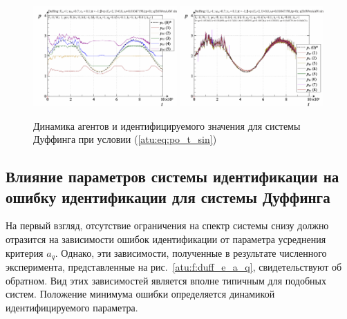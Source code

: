 \begin{figure}[ht!]
\begin{center}
  \includegraphics[width=0.49\textwidth]{p/cha/duff/duff_id-p_t_pi_ql3rlWvnAAW_sin.png}
  \hfill
  \includegraphics[width=0.49\textwidth]{p/cha/duff/duff_id-p_t_p_ql3rlWvnAAW_sin.png}
\end{center}
  \caption{Динамика агентов и идентифицируемого значения для системы Дуффинга при условии (\ref{atu:eq:po_t_sin})}
\label{atu:f:duff_id_sin}
\end{figure}



\subsection{Влияние параметров системы идентификации на ошибку идентификации для системы Дуффинга}  %

На первый взгляд, отсутствие ограничения на спектр системы снизу
должно отразится на зависимости ошибок идентификации
от параметра усреднения критерия $a_q$.
Однако, эти зависимости, полученные в результате численного эксперимента, представленные на рис.~\ref{atu:f:duff_e_a_q},
свидетельствуют об обратном. Вид этих зависимостей является вполне типичным
для подобных систем. Положение минимума ошибки определяется
динамикой идентифицируемого параметра.

